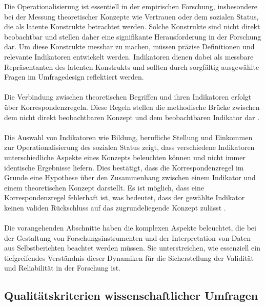 \documentclass[german,report]{i1thesis}
\begin{document}
Die Operationalisierung ist essentiell in der empirischen Forschung, insbesondere bei der Messung theoretischer Konzepte wie Vertrauen oder dem sozialen Status, die als latente Konstrukte betrachtet werden. Solche Konstrukte sind nicht direkt beobachtbar und stellen daher eine signifikante Herausforderung in der Forschung dar. Um diese Konstrukte messbar zu machen, müssen präzise Definitionen und relevante Indikatoren entwickelt werden. Indikatoren dienen dabei als messbare Repräsentanten des latenten Konstrukts und sollten durch sorgfältig ausgewählte Fragen im Umfragedesign reflektiert werden\cite{Tausendpfund2018}.  \\ 
\\
Die Verbindung zwischen theoretischen Begriffen und ihren Indikatoren erfolgt über Korrespondenzregeln. Diese Regeln stellen die methodische Brücke zwischen dem nicht direkt beobachtbaren Konzept und dem beobachtbaren Indikator dar \cite{Tausendpfund2018}. \\
\\
Die Auswahl von Indikatoren wie Bildung, berufliche Stellung und Einkommen zur Operationalisierung des sozialen Status zeigt, dass verschiedene Indikatoren unterschiedliche Aspekte eines Konzepts beleuchten können und nicht immer identische Ergebnisse liefern. Dies bestätigt, dass die Korrespondenzregel im Grunde eine Hypothese über den Zusammenhang zwischen einem Indikator und einem theoretischen Konzept darstellt. Es ist möglich, dass eine Korrespondenzregel fehlerhaft ist, was bedeutet, dass der gewählte Indikator keinen validen Rückschluss auf das zugrundeliegende Konzept zulässt \cite{Tausendpfund2018}.\\
\\
Die vorangehenden Abschnitte haben die komplexen Aspekte beleuchtet, die bei der Gestaltung von Forschungsinstrumenten und der Interpretation von Daten aus Selbstberichten beachtet werden müssen. Sie unterstreichen, wie essenziell ein tiefgreifendes Verständnis dieser Dynamiken für die Sicherstellung der Validität und Reliabilität in der Forschung ist.

\subsection{Qualitätskriterien wissenschaftlicher Umfragen}
\end{document}
